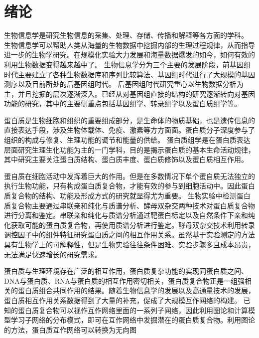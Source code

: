 \chapter{绪论}
\label{cha:intro}

生物信息学是研究生物信息的采集、处理、存储、传播和解释等各方面的学科。
生物信息学可以帮助人类从海量的生物数据中挖掘内部的生理过程规律，从而指导进一步的生物学研究。在规模化实验大力发展和海量数据爆发的如今，如何有效的利用生物数据变得越来越中了。
生物信息学分为三个主要的发展阶段，前基因组时代主要建立了各种生物数据库和序列比较算法、基因组时代进行了大规模的基因测序以及目前所处的后基因组时代。
后基因组时代研究重心以生物数据分析为主，并且挖掘的层次逐渐深入。已经从对基因组直接的结构的研究逐渐转向对基因功能的研究，其中的主要侧重点包括基因组学、转录组学以及蛋白质组学等\cite{Helms2008Principles}。

蛋白质是生物细胞和组织的重要组成部分，是生命体的物质基础，也是遗传信息的直接表达手段，涉及生物体载体、免疫、激素等方方面面。蛋白质分子深度参与了组织的构成与修复、生理功能的调节和能量的供给。
蛋白质组学\cite{Schubert2017Quantitative}是在蛋白质表达层面研究生理生化功能为主的一门学科，目的是揭示蛋白质的基本生命活动规律，其中研究主要关注蛋白质结构、蛋白质丰度、蛋白质修饰以及蛋白质相互作用。

蛋自质在细胞活动中发挥着巨大的作用。但是在多数情况下单个蛋自质无法独立的执行生物功能，只有构成蛋白质复合物，才能有效的参与到细胞活动中\cite{Gavin2018Functional}。因此蛋白质复合物的结构、功能及形成方式的研究就显得尤为重要。
生物实验中检测蛋白质复合物主要通过串联亲和纯化与质谱分析\cite{Rigaut1999A}、酵母双杂交\cite{Li1993Identification}两种技术对蛋白质复合物进行分离和鉴定。串联亲和纯化与质谱分析通过靶蛋白标定以及自然条件下亲和纯化获取可能的蛋白质复合物，再使用质谱分析进行鉴定。酵母双杂交技术利用转录调控因子中的组件特征研究蛋白质之间的相互作用关系。虽然基于实验测定的方法具有生物学上的可解释性，但是生物实验往往条件困难、实验步骤多且成本昂贵，无法满足快速增长的研究需求。

蛋白质与生理环境存在广泛的相互作用，蛋白质复杂功能的实现同蛋白质之间、DNA与蛋白质、RNA与蛋白质的相互作用密切相关，蛋白质复合物正是一组强相关的蛋白质组合共同作用的结果。随着生物信息学的发展以及高通量技术的发展，蛋白质相互作用关系数据得到了大量的补充，促成了大规模互作网络的构建\cite{Butland2005Interaction}。
已知的蛋白质复合物可以视作互作网络里面的一系列子网络，因此利用图论和计算模型学习子网络的分布模式，即可在互作网络中发掘潜在的蛋白质复合物\cite{2001Protein}。利用图论的方法，蛋白质互作网络可以转换为无向图

